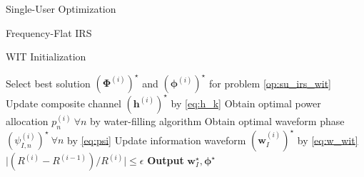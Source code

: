 \documentclass{IEEEtran}
\begin{document}
\begin{section}{Single-User Optimization}
\begin{subsection}{Frequency-Flat IRS}
\begin{subsubsection}{WIT Initialization}
\begin{algorithm}
\begin{algorithmic}[1]
					\State Select best solution $(\boldsymbol{\Phi}^{(i)})^\star$ and $(\boldsymbol{\phi}^{(i)})^\star$ for problem \ref{op:su_irs_wit}
					\State Update composite channel $(\boldsymbol{h}^{(i)})^\star$ by \ref{eq:h_k}
					\State Obtain optimal power allocation $p_n^{(i)} \ \forall n$ by water-filling algorithm
					\State Obtain optimal waveform phase $(\psi_{I,n}^{(i)})^\star \ \forall n$ by \ref{eq:psi}
					\State Update information waveform $(\boldsymbol{w}_I^{(i)})^\star$ by \ref{eq:w_wit}
					\Until $\lvert (R^{(i)}-R^{(i-1)}) / R^{(i)} \rvert \le \epsilon$
					\State \textbf{Output} $\boldsymbol{w}_I^\star, \boldsymbol{\phi}^\star$
				\end{algorithmic}
			\end{algorithm}
		\end{subsubsection}
	\end{subsection}
\end{section}



\end{document}
